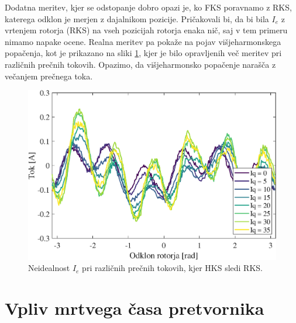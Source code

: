 \documentclass[a4paper,twoside,openright,12pt,slovene]{book}
\begin{document}

Dodatna meritev, kjer se odstopanje dobro opazi je, ko FKS poravnamo z RKS, katerega odklon je merjen z dajalnikom pozicije. Pričakovali bi, da bi bila $I_e$ z vrtenjem rotorja (RKS)
na vseh pozicijah rotorja enaka nič, saj v tem primeru nimamo napake ocene. Realna meritev pa pokaže na pojav višjeharmonskega popačenja, kot je prikazano na sliki
\ref{tokovniOdzivIs_HKSslediRKS_diff}, kjer je bilo opravljenih več meritev pri različnih prečnih tokovih. Opazimo, da višjeharmonsko popačenje narašča z večanjem prečnega toka.

\begin{figure}[!htbp]
    \centering
    \includegraphics[width=0.95\columnwidth]{Slike/tokovniOdzivIs_HKSslediRKS_diff.eps}
    \caption{\label{tokovniOdzivIs_HKSslediRKS_diff} Neidealnost $I_e$ pri različnih prečnih tokovih, kjer HKS sledi RKS.}
\end{figure}

\section{Vpliv mrtvega časa pretvornika}
\end{document}

